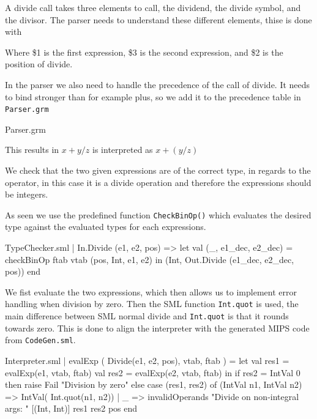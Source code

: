 \documentclass[11pt,a4paper,oneside]{report}
\begin{document}
A divide call takes three elements to call, the dividend, the divide symbol, and the divisor. The parser needs to understand these different elements, thise is done with
Where \$1 is the first expression, \$3 is the second expression, and \$2 is the position of divide.

In the parser we also need to handle the precedence of the call of divide. It needs to bind stronger than for example plus, so we add it to the precedence table in \texttt{Parser.grm}
\begin{code}[firstnumber=26]{Parser.grm}
\end{code}
This results in $x + y / z$ is interpreted as $x + (y / z)$

We check that the two given expressions are of the correct type, in regards to the operator, in this case it is a divide operation and therefore the expressions should be integers.

As seen we use the predefined function \texttt{CheckBinOp()} which evaluates the desired type against the evaluated types for each expressions.
\begin{code}[firstnumber=112]{TypeChecker.sml}
| In.Divide (e1, e2, pos)
  => let val (_, e1_dec, e2_dec) =
            checkBinOp ftab vtab (pos, Int, e1, e2)
     in (Int,
         Out.Divide (e1_dec, e2_dec, pos))
     end
\end{code}

We fist evaluate the two expressions, which then allows us to implement error handling when division by zero. Then the SML function \texttt{Int.quot} is used, the main difference between SML normal divide and \texttt{Int.quot} is that it rounds towards zero. This is done to align the interpreter with the generated MIPS code from \texttt{CodeGen.sml}.
\newpage

\begin{code}[firstnumber=170]{Interpreter.sml}
| evalExp ( Divide(e1, e2, pos), vtab, ftab ) =
    let
      val res1   = evalExp(e1, vtab, ftab)
      val res2   = evalExp(e2, vtab, ftab)
    in
      if res2 = IntVal 0 then raise Fail "Division by zero"
        else
          case (res1, res2) of
            (IntVal n1, IntVal n2) => IntVal( Int.quot(n1, n2))
            | _ => invalidOperands
                "Divide on non-integral args: "
                    [(Int, Int)] res1 res2 pos
    end
\end{code}
\end{document}
